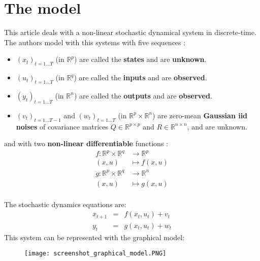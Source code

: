 \section{The model}

This article deals with a non-linear stochastic dynamical system in discrete-time.
The authors model with this systems with five sequences :
\begin{itemize}
  \item $(x_t)_{t=1 \ldots T}$ (in $\mathbb{R}^p$) are called the \textbf{states} and are \textbf{unknown}.
  \item $(u_t)_{t=1 \ldots T}$ (in $\mathbb{R}^q$) are called the \textbf{inputs} and are \textbf{observed}.
  \item $(y_t)_{t=1 \ldots T}$ (in $\mathbb{R}^n$) are called the \textbf{outputs} and are \textbf{observed}.
  \item $(v_t)_{t=1 \ldots T-1}$ and $(w_t)_{t=1 \ldots T}$ (in $\mathbb{R}^p \times \mathbb{R}^n$) are zero-mean \textbf{Gaussian iid noises} of covariance matrices $Q \in \mathbb{R}^{p \times p}$ and $R \in \mathbb{R}^{n \times n}$, and are unknown.
\end{itemize}
and with two \textbf{non-linear differentiable} functions :
\begin{align*}
  f \colon \mathbb{R}^p \times \mathbb{R}^q &\to \mathbb{R}^p\\
  (x,u) &\mapsto f(x, u)\\
  g \colon \mathbb{R}^p \times \mathbb{R}^q &\to \mathbb{R}^n\\
  (x,u) &\mapsto g(x, u)\\
\end{align*}

The stochastic dynamics equations are:
\begin{eqnarray}
  x_{t+1}&=& f(x_t,u_t)+v_t\label{eq:A}\\
  y_t &=& g(x_t,u_t)+w_t\label{eq:B}
\end{eqnarray}
This system can be represented with the graphical model:
\begin{figure}[H]
	\texttt{[image: screenshot\_graphical\_model.PNG]}
\end{figure}
